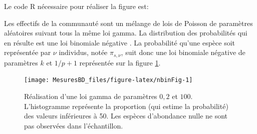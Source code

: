 \documentclass[
  11pt,
  french,
  a4paper,
  extrafontsizes,onecolumn,openright
  ]{memoir}
\newenvironment{Shaded}{\begin{snugshade}}{\end{snugshade}}
\newcommand{\DataTypeTok}[1]{\textcolor[rgb]{0.13,0.29,0.53}{#1}}
\newcommand{\DecValTok}[1]{\textcolor[rgb]{0.00,0.00,0.81}{#1}}
\newcommand{\FloatTok}[1]{\textcolor[rgb]{0.00,0.00,0.81}{#1}}
\newcommand{\KeywordTok}[1]{\textcolor[rgb]{0.13,0.29,0.53}{\textbf{#1}}}
\newcommand{\NormalTok}[1]{#1}
\newcommand{\OperatorTok}[1]{\textcolor[rgb]{0.81,0.36,0.00}{\textbf{#1}}}
\newcommand{\StringTok}[1]{\textcolor[rgb]{0.31,0.60,0.02}{#1}}
\begin{document}
\normalsize

Le code R nécessaire pour réaliser la figure est:

\scriptsize

\begin{Shaded}
\end{Shaded}

\normalsize

Les effectifs de la communauté sont un mélange de lois de Poisson de paramètres aléatoires suivant tous la même loi gamma.
La distribution des probabilités qui en résulte est une loi binomiale négative \autocite{Greenwood1920}.
La probabilité qu'une espèce soit représentée par \(\nu\) individus, notée \({\pi}_{s,\nu}\), suit donc une loi binomiale négative de paramètres \(k\) et \({1}/{p+1}\) représentée sur la figure \ref{fig:nbinFig}.



\scriptsize

\begin{figure}

{\centering \texttt{[image: MesuresBD\_files/figure-latex/nbinFig-1]} 

}

\caption{Réalisation d'une loi gamma de paramètres \(0,2\) et \(100\). L'histogramme représente la proportion (qui estime la probabilité) des valeurs inférieures à 50. Les espèces d'abondance nulle ne sont pas observées dans l'échantillon.}\label{fig:nbinFig}
\end{figure}
\end{document}
